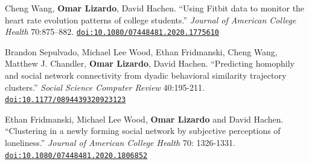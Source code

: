 \ind Cheng Wang, {\bf Omar Lizardo}, David Hachen. ``Using Fitbit data to monitor the heart rate evolution patterns of college students.'' {\em Journal of American College Health} 70:875–882. \href{https://doi.org/10.1080/07448481.2020.1775610}{\nolinkurl{doi:10.1080/07448481.2020.1775610}}

\ind Brandon Sepulvado, Michael Lee Wood, Ethan Fridmanski, Cheng Wang, Matthew J. Chandler, {\bf Omar Lizardo}, David Hachen. ``Predicting homophily and social network connectivity from dyadic behavioral similarity trajectory clusters.'' {\em Social Science Computer Review} 40:195-211. \href{https://doi.org/10.1177/0894439320923123}{\nolinkurl{doi:10.1177/0894439320923123}}

\ind \ind Ethan Fridmanski, Michael Lee Wood, {\bf Omar Lizardo} and David Hachen. ``Clustering in a newly forming social network by subjective perceptions of loneliness.''  {\em Journal of American College Health} 70: 1326-1331. \href{https://doi.org/10.1080/07448481.2020.1806852}{\nolinkurl{doi:10.1080/07448481.2020.1806852}}
